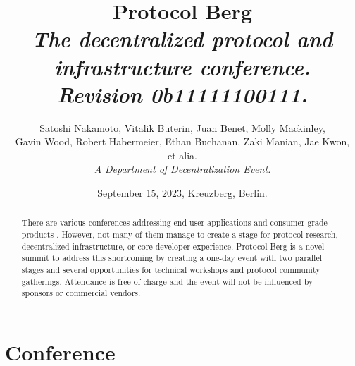 \documentclass[a4paper,12pt]{article}
\title{\huge \textbf{Protocol Berg}\\[.5em]
    \large \textit{The decentralized protocol and infrastructure conference.\\
     Revision 0b11111100111.}}
\author{Satoshi Nakamoto, Vitalik Buterin, Juan Benet, Molly Mackinley,\\
    Gavin Wood, Robert Habermeier, Ethan Buchanan, Zaki Manian, Jae Kwon,\\
    et alia.\\[1em]\textit{A Department of Decentralization \cite{dod} Event.}}
\date{September 15, 2023, Kreuzberg, Berlin.}
\begin{document}
  \maketitle

  \begin{abstract}
    There are various conferences addressing end-user applications and consumer-grade products
    \cite{dapp}\cite{desci}\cite{bbw}.
    However, not many of them manage to create a stage for protocol research, decentralized
    infrastructure, or core-developer experience. Protocol Berg is a novel summit to address this
    shortcoming by creating a one-day event with two parallel stages and several opportunities for
    technical workshops and protocol community gatherings. Attendance is free of charge and the
    event will not be influenced by sponsors or commercial vendors.
  \end{abstract}

  \section{Conference}
\end{document}
